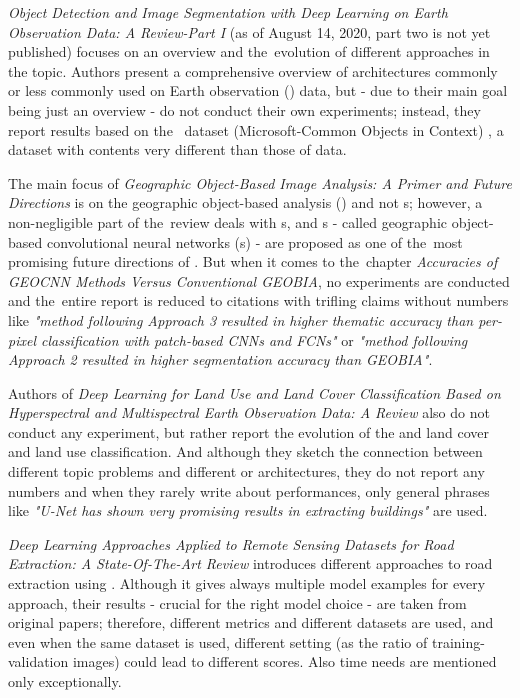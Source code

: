\textit{Object Detection and Image Segmentation with Deep Learning on Earth Observation Data: A Review-Part I} (as of August 14, 2020, part two is not yet published) focuses on an overview and the~evolution of different approaches in the topic. Authors present a comprehensive overview of  architectures commonly or less commonly used on Earth observation () data, but - due to their main goal being just an overview - do not conduct their own experiments; instead, they report results based on the~ dataset (Microsoft-Common Objects in Context) \cite{coco}, a dataset with contents very different than those of  data.

The main focus of \textit{Geographic Object-Based Image Analysis: A Primer and Future Directions} is on the geographic object-based analysis () and not s; however, a non-negligible part of the~review deals with s, and s - called geographic object-based convolutional neural networks (s) - are proposed as one of the~most promising future directions of . But when it comes to the~chapter \textit{Accuracies of GEOCNN Methods Versus Conventional GEOBIA}, no experiments are conducted and the~entire report is reduced to citations with trifling claims without numbers like \textit{"method following Approach 3 resulted in higher thematic accuracy than per-pixel classification with patch-based CNNs and FCNs"} or \textit{"method following Approach 2 resulted in higher segmentation accuracy than GEOBIA"}.

Authors of \textit{Deep Learning for Land Use and Land Cover Classification Based on Hyperspectral and Multispectral Earth Observation Data: A Review} also do not conduct any experiment, but rather report the evolution of the  and land cover and land use classification. And although they sketch the connection between different topic problems and different  or  architectures, they do not report any numbers and when they rarely write about performances, only general phrases like \textit{"U-Net has shown very promising results in extracting buildings"} are used.

\textit{Deep Learning Approaches Applied to Remote Sensing Datasets for Road Extraction: A State-Of-The-Art Review} introduces different approaches to road extraction using . Although it gives always multiple model examples for every approach, their results - crucial for the right model choice - are taken from original papers; therefore, different metrics and different datasets are used, and even when the same dataset is used, different setting (as the ratio of training-validation images) could lead to different scores. Also time needs are mentioned only exceptionally.

